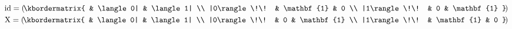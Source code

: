 \documentclass[multi,convert={convertexe={convert},density=120}]{standalone}
\begin{document}
\begin{math}\displaystyle
  \mathrm{id} =
    \left(\!\kbordermatrix{
                     & \langle 0| & \langle 1| \\
       |0\rangle\!\! & \mathbf{1} &          0 \\
       |1\rangle\!\! &          0 & \mathbf{1}
    }\!\right)
\end{math}
\begin{math}\displaystyle
  \mathrm{X} =
    \left(\!\kbordermatrix{
                     & \langle 0| & \langle 1| \\
       |0\rangle\!\! &          0 & \mathbf{1} \\
       |1\rangle\!\! & \mathbf{1} &          0
    }\!\right)
\end{math}
\end{document}
